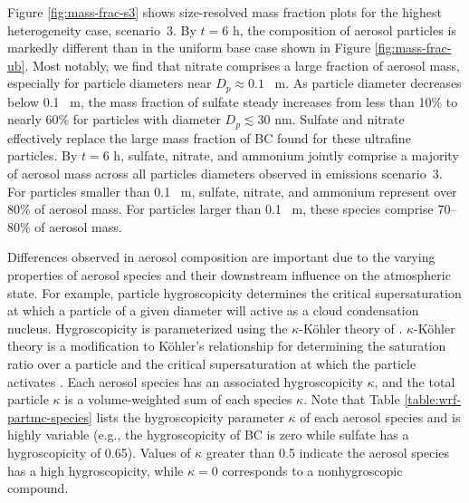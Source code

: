Figure \ref{fig:mass-frac-s3} shows size-resolved mass fraction plots for the highest heterogeneity case, scenario~3. By $t=6$ h, the composition of aerosol particles is markedly different than in the uniform base case shown in Figure \ref{fig:mass-frac-ub}. Most notably, we find that nitrate comprises a large fraction of aerosol mass, especially for particle diameters near $D_p\approx0.1$ \si{\mu m}. As particle diameter decreases below 0.1 \si{\mu m}, the mass fraction of sulfate steady increases from less than 10\% to nearly 60\% for particles with diameter $D_p  \lesssim 30$ nm. Sulfate and nitrate effectively replace the large mass fraction of BC found for these ultrafine particles. By $t=6$ h, sulfate, nitrate, and ammonium jointly comprise a majority of aerosol mass across all particles diameters observed in emissions scenario~3. For particles smaller than 0.1 \si{\mu m}, sulfate, nitrate, and ammonium represent over 80\% of aerosol mass. For particles larger than 0.1 \si{\mu m}, these species comprise 70--80\% of aerosol mass.

Differences observed in aerosol composition are important due to the varying properties of aerosol species and their downstream influence on the atmospheric state. For example, particle hygroscopicity determines the critical supersaturation at which a particle of a given diameter will active as a cloud condensation nucleus. Hygroscopicity is parameterized using the $\kappa$-Köhler theory of \textcite{petters_single_2007}. $\kappa$-Köhler theory is a modification to Köhler's relationship for determining the saturation ratio over a particle and the critical supersaturation at which the particle activates \parencite{kohler_nucleus_1936}. Each aerosol species has an associated hygroscopicity $\kappa$, and the total particle $\kappa$ is a volume-weighted sum of each species $\kappa$. Note that Table \ref{table:wrf-partmc-species} lists the hygroscopicity parameter $\kappa$ of each aerosol species and is highly variable (e.g., the hygroscopicity of BC is zero while sulfate has a hygroscopicity of 0.65). Values of  $\kappa$ greater than 0.5 indicate the aerosol species has a high hygroscopicity, while $\kappa=0$ corresponds to a nonhygroscopic compound.

